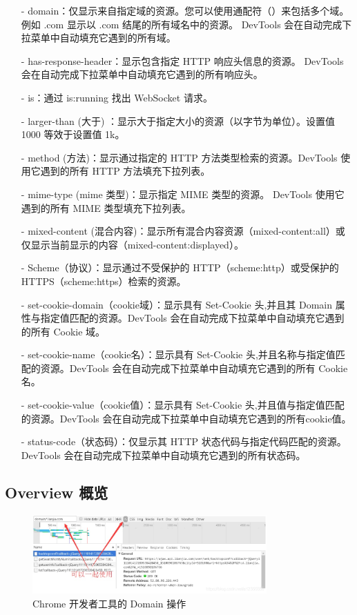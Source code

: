 \begin{itemize}
\item [-] domain：仅显示来自指定域的资源。您可以使用通配符（）来包括多个域。例如 .com 显示以 .com 结尾的所有域名中的资源。 DevTools 会在自动完成下拉菜单中自动填充它遇到的所有域。
\item [-] has-response-header：显示包含指定 HTTP 响应头信息的资源。 DevTools 会在自动完成下拉菜单中自动填充它遇到的所有响应头。
\item [-] is：通过 is:running 找出 WebSocket 请求。
\item [-] larger-than (大于) ：显示大于指定大小的资源（以字节为单位）。设置值 1000 等效于设置值 1k。
\item [-] method (方法)：显示通过指定的 HTTP 方法类型检索的资源。DevTools 使用它遇到的所有 HTTP 方法填充下拉列表。
\item [-] mime-type (mime 类型)：显示指定 MIME 类型的资源。 DevTools 使用它遇到的所有 MIME 类型填充下拉列表。
\item [-] mixed-content (混合内容)：显示所有混合内容资源（mixed-content:all）或仅显示当前显示的内容（mixed-content:displayed）。
\item [-] Scheme（协议）：显示通过不受保护的 HTTP（scheme:http）或受保护的 HTTPS（scheme:https）检索的资源。
\item [-] set-cookie-domain（cookie域）：显示具有 Set-Cookie 头,并且其 Domain 属性与指定值匹配的资源。DevTools 会在自动完成下拉菜单中自动填充它遇到的所有 Cookie 域。
\item [-] set-cookie-name（cookie名）：显示具有 Set-Cookie 头,并且名称与指定值匹配的资源。DevTools 会在自动完成下拉菜单中自动填充它遇到的所有 Cookie 名。
\item [-] set-cookie-value（cookie值）：显示具有 Set-Cookie 头,并且值与指定值匹配的资源。DevTools 会在自动完成下拉菜单中自动填充它遇到的所有cookie值。
\item [-] status-code（状态码）：仅显示其 HTTP 状态代码与指定代码匹配的资源。DevTools 会在自动完成下拉菜单中自动填充它遇到的所有状态码。
\end{itemize}

\subsection{Overview 概览}

\begin{figure}[htb]
\centering 
\includegraphics[width=0.80\textwidth]{img/newch1m10.png} 
\caption{Chrome 开发者工具的 Domain 操作}
\label{Test}
\end{figure}


